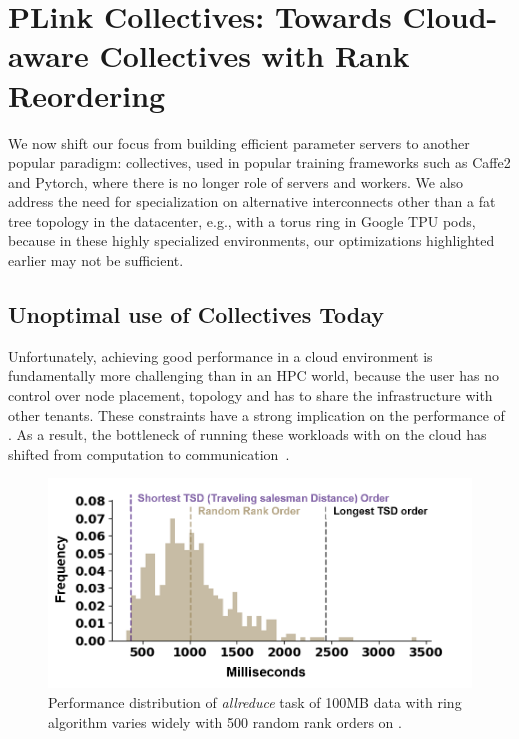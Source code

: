 \chapter{PLink Collectives: Towards Cloud-aware Collectives with Rank Reordering}
\label{sec:cc}
We now shift our focus from building efficient parameter servers to another popular paradigm: collectives, used in popular training frameworks such as Caffe2 and Pytorch, where there is no longer role of servers and workers. We also address the need for specialization on alternative interconnects other than a fat tree topology in the datacenter, e.g., with a torus ring in Google TPU pods, because in these highly specialized environments, our optimizations highlighted earlier may not be sufficient. 


\section{Unoptimal use of Collectives Today}
Unfortunately, achieving good \mpi performance in a cloud environment is fundamentally more challenging than in an HPC world, because the user has no control over node placement, topology and has to share the infrastructure with other tenants. These constraints have a strong implication on the performance of \mpi. As a result, the bottleneck of running these workloads with \mpi on the cloud has shifted from computation to communication~\cite{7092922}.

%

\begin{figure}[ht]
    \centering
    \includegraphics[width=.5\linewidth, trim=8 3 14 10,clip]{Figures/azringperformance.png}
    \caption{Performance distribution of \textit{allreduce} task of 100MB data with ring algorithm varies widely with 500 random rank orders on \azure.}
    \label{fig:azringperformance}
\end{figure}


